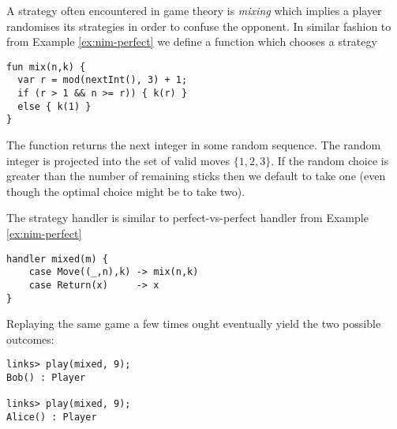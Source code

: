 \begin{example}\label{ex:nim-mixing}
A strategy often encountered in game theory is \emph{mixing} which implies a player randomises its strategies in order to confuse the opponent. In similar fashion to  from Example \ref{ex:nim-perfect} we define a function  which chooses a strategy
\begin{lstlisting}[style=links]
fun mix(n,k) {
  var r = mod(nextInt(), 3) + 1;
  if (r > 1 && n >= r)) { k(r) }
  else { k(1) }
}
\end{lstlisting}
The function  returns the next integer in some random sequence. The random integer is projected into the set of valid moves $\{1,2,3\}$. If the random choice  is greater than the number of remaining sticks  then we default to take one (even though the optimal choice might be to take two).

The  strategy handler is similar to perfect-vs-perfect handler from Example \ref{ex:nim-perfect}
\begin{lstlisting}[style=links]
handler mixed(m) {
    case Move((_,n),k) -> mix(n,k)
    case Return(x)     -> x			  
}
\end{lstlisting}
Replaying the same game a few times ought eventually yield the two possible outcomes:
\begin{lstlisting}[style=links]
links> play(mixed, 9);
Bob() : Player

links> play(mixed, 9);
Alice() : Player
\end{lstlisting}
\end{example}

